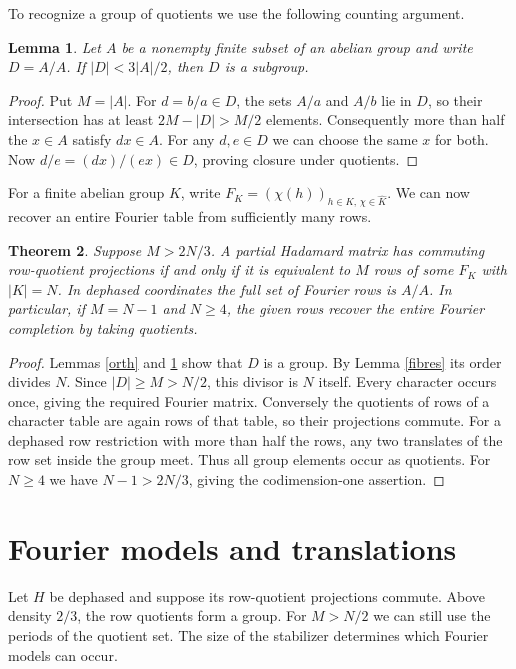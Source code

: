 \documentclass[11pt,a4paper]{article}
\newtheorem{thm}{Theorem}[section]
\newtheorem{lem}[thm]{Lemma}
\begin{document}
To recognize a group of quotients we use the following counting argument.

\begin{lem}\label{small}
Let $A$ be a nonempty finite subset of an abelian group and write $D=A/A$. If $|D|<3|A|/2$, then $D$ is a subgroup.
\end{lem}
\begin{proof}
Put $M=|A|$. For $d=b/a\in D$, the sets $A/a$ and $A/b$ lie in $D$, so their intersection has at least $2M-|D|>M/2$ elements. Consequently more than half the $x\in A$ satisfy $dx\in A$. For any $d,e\in D$ we can choose the same $x$ for both. Now $d/e=(dx)/(ex)\in D$, proving closure under quotients.
\end{proof}

For a finite abelian group $K$, write $F_K=(\chi(h))_{h\in K,\,\chi\in\widehat K}$. We can now recover an entire Fourier table from sufficiently many rows.

\begin{thm}\label{rigidity}
Suppose $M>2N/3$. A partial Hadamard matrix has commuting row-quotient projections if and only if it is equivalent to $M$ rows of some $F_K$ with $|K|=N$. In dephased coordinates the full set of Fourier rows is $A/A$. In particular, if $M=N-1$ and $N\geq4$, the given rows recover the entire Fourier completion by taking quotients.
\end{thm}
\begin{proof}
Lemmas \ref{orth} and \ref{small} show that $D$ is a group. By Lemma \ref{fibres} its order divides $N$. Since $|D|\geq M>N/2$, this divisor is $N$ itself. Every character occurs once, giving the required Fourier matrix. Conversely the quotients of rows of a character table are again rows of that table, so their projections commute. For a dephased row restriction with more than half the rows, any two translates of the row set inside the group meet. Thus all group elements occur as quotients. For $N\geq4$ we have $N-1>2N/3$, giving the codimension-one assertion.
\end{proof}

\section{Fourier models and translations}\label{fouriersection}

Let $H$ be dephased and suppose its row-quotient projections commute. Above density $2/3$, the row quotients form a group. For $M>N/2$ we can still use the periods of the quotient set. The size of the stabilizer determines which Fourier models can occur.
\end{document}
